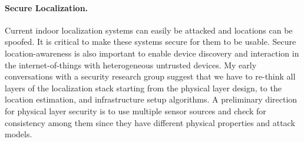 \documentclass[10pt]{article}
\begin{document}

\paragraph{Secure Localization. }
Current indoor localization systems can easily be attacked and locations can be spoofed. It is critical to make these systems secure for them to be usable. Secure location-awareness is also important to enable device discovery and interaction in the internet-of-things with heterogeneous untrusted devices.
My early conversations with a security research group suggest that we have to re-think all layers of the localization stack starting from the physical layer design, to the location estimation, and infrastructure setup algorithms. %
A preliminary direction for physical layer security is to use multiple sensor sources and check for consistency among them since they have different physical properties and attack models. %
\end{document}
